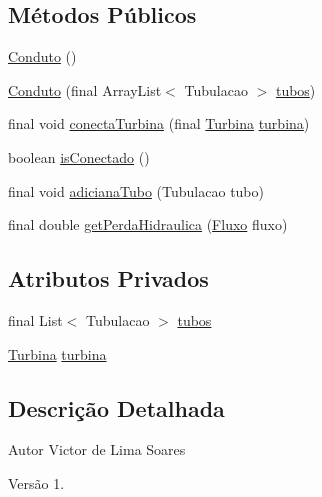 \subsection*{Métodos Públicos}
\begin{DoxyCompactItemize}
\item 
\hyperlink{classusina_1_1tubulacao_1_1_conduto_a3b4a6577c8557142c06215b9714f60c0}{Conduto} ()
\item 
\hyperlink{classusina_1_1tubulacao_1_1_conduto_a65d6d9d7acde343b6598d090af96acb8}{Conduto} (final Array\-List$<$ Tubulacao $>$ \hyperlink{classusina_1_1tubulacao_1_1_conduto_a0818dcc694d38d10020eb0335e4d44b0}{tubos})
\item 
final void \hyperlink{classusina_1_1tubulacao_1_1_conduto_aa187e888eb82bed03c1485f329f74267}{conecta\-Turbina} (final \hyperlink{classusina_1_1_turbina}{Turbina} \hyperlink{classusina_1_1tubulacao_1_1_conduto_a82d53c81437766af2da7d80771ab5fad}{turbina})
\item 
boolean \hyperlink{classusina_1_1tubulacao_1_1_conduto_a66622b4eb62e7fc446410ef49dda64b5}{is\-Conectado} ()
\item 
final void \hyperlink{classusina_1_1tubulacao_1_1_conduto_a40cfa8928ec6b78584f0dada4e5a40fc}{adiciana\-Tubo} (Tubulacao tubo)
\item 
final double \hyperlink{classusina_1_1tubulacao_1_1_conduto_a2b1644e1a9e6a68245c942aa6e01db59}{get\-Perda\-Hidraulica} (\hyperlink{classusina_1_1_fluxo}{Fluxo} fluxo)
\end{DoxyCompactItemize}
\subsection*{Atributos Privados}
\begin{DoxyCompactItemize}
\item 
final List$<$ Tubulacao $>$ \hyperlink{classusina_1_1tubulacao_1_1_conduto_a0818dcc694d38d10020eb0335e4d44b0}{tubos}
\item 
\hyperlink{classusina_1_1_turbina}{Turbina} \hyperlink{classusina_1_1tubulacao_1_1_conduto_a82d53c81437766af2da7d80771ab5fad}{turbina}
\end{DoxyCompactItemize}


\subsection{Descrição Detalhada}
\begin{DoxyAuthor}{Autor}
Victor de Lima Soares 
\end{DoxyAuthor}
\begin{DoxyVersion}{Versão}
1. 
\end{DoxyVersion}



